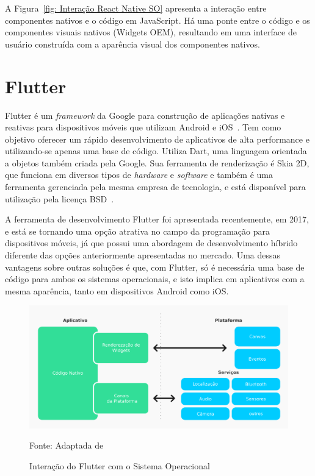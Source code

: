 A Figura~\ref{fig: Interação React Native SO} apresenta a interação entre componentes nativos e o código em JavaScript.
Há uma ponte entre o código e os componentes visuais nativos (Widgets OEM), resultando em uma interface de usuário construída com a aparência visual dos componentes nativos.


\section{Flutter}\label{sec:flutter}

Flutter é um \textit{framework} da Google para construção de aplicações nativas e reativas para dispositivos móveis que utilizam Android e iOS~\cite{zammetti2019practical}.
Tem como objetivo oferecer um rápido desenvolvimento de aplicativos de alta performance e utilizando-se apenas uma base de código.
Utiliza Dart, uma linguagem orientada a objetos também criada pela Google.
Sua ferramenta de renderização é Skia 2D, que funciona em diversos tipos de \textit{hardware} e \textit{software} e também é uma ferramenta gerenciada pela mesma empresa de tecnologia, e está disponível para utilização pela licença BSD~\cite{napoli2019beginning}.


A ferramenta de desenvolvimento Flutter foi apresentada recentemente, em 2017, e está se tornando uma opção atrativa no campo da programação para dispositivos móveis, já que possui uma abordagem de desenvolvimento híbrido diferente das opções anteriormente apresentadas no mercado.
Uma dessas vantagens sobre outras soluções é que, com Flutter, só é necessária uma base de código para ambos os sistemas operacionais, e isto implica em aplicativos com a mesma aparência, tanto em dispositivos Android como iOS\@.



\begin{figure}[H]
    \centering
    \includegraphics[width=15cm]{imagens/interacaoFlutter}
    \caption{Interação do Flutter com o Sistema Operacional}
    Fonte: Adaptada de~\cite{yatsenko2019comparative}
    \label{fig: Interação Flutter SO}
\end{figure}

